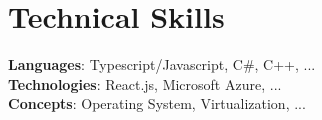 \section{Technical Skills}
    \begin{itemize}[leftmargin=0.15in, label={}]
	\small{\item{
		\textbf{Languages}{: Typescript/Javascript, C\#, C++, ...} \\
		\textbf{Technologies}{: React.js, Microsoft Azure, ...} \\
		\textbf{Concepts}{: Operating System, Virtualization, ...}
	}}
    \end{itemize}